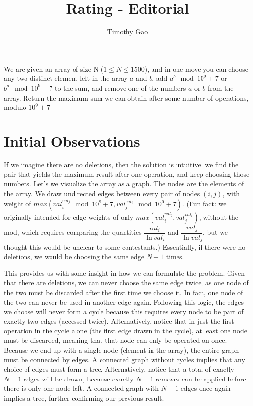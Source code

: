 \documentclass[15pt]{article}
\title{Rating - Editorial}
\author{Timothy Gao}
\date{}
\begin{document}
\maketitle

We are given an array of size N ($1 \leq N \leq 1500$), and in one move you can choose any two distinct element left in the array $a$ and $b$, add $a^b \mod 10^9+7$ or $b^a \mod 10^9+7$ to the sum, and remove one of the numbers $a$ or $b$ from the array. Return the maximum sum we can obtain after some number of operations, modulo $10^9+7$.

\section{Initial Observations}

If we imagine there are no deletions, then the solution is intuitive: we find the pair that yields the maximum result after one operation, and keep choosing those numbers. Let's we visualize the array as a graph. The nodes are the elements of the array. We draw undirected edges between every pair of nodes $(i,j)$, with weight of $max(val_i^{val_j} \mod 10^9+7, val_j^{val_i} \mod 10^9+7)$. (Fun fact: we originally intended for edge weights of only $max(val_i^{val_j}, val_j^{val_i})$, without the mod, which requires comparing the quantities $\dfrac{val_i}{\ln val_i}$ and $\dfrac{val_j}{\ln val_j}$, but we thought this would be unclear to some contestants.)  Essentially, if there were no deletions, we would be choosing the same edge $N-1$ times.

This provides us with some insight in how we can formulate the problem. Given that there are deletions, we can never choose the same edge twice, as one node of the two must be discarded after the first time we choose it. In fact, one node of the two can never be used in another edge again. Following this logic, the edges we choose will never form a cycle because this requires every node to be part of exactly two edges (accessed twice). Alternatively, notice that in just the first operation in the cycle alone (the first edge drawn in the cycle), at least one node must be discarded, meaning that that node can only be operated on once. Because we end up with a single node (element in the array), the entire graph must be connected by edges. A connected graph without cycles implies that any choice of edges must form a tree. Alternatively, notice that a total of exactly $N-1$ edges will be drawn, because exactly $N-1$ removes can be applied before there is only one node left. A connected graph with $N-1$ edges once again implies a tree, further confirming our previous result.
\end{document}
